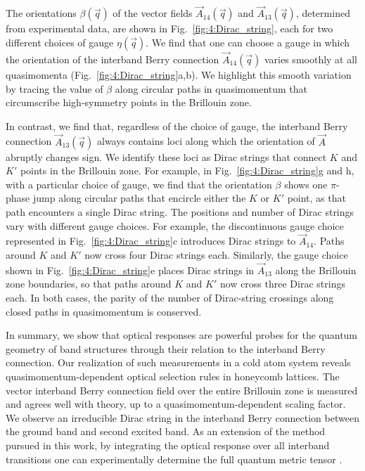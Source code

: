 \documentclass[superscriptaddress, reprint, amsmath, amssymb, aps, prl]{revtex4-2}
\begin{document}
The orientations $\beta(\vec{q})$ of the vector fields $\vec{A}_{14}(\vec{q})$ and $\vec{A}_{13}(\vec{q})$, determined from experimental data, are shown in Fig.\ \ref{fig:4:Dirac_string}, each for two different choices of gauge $\eta(\vec{q})$.  We find that one can choose a gauge in which the orientation of the interband Berry connection $\vec{A}_{14}(\vec{q})$ varies smoothly at all quasimomenta (Fig.~\ref{fig:4:Dirac_string}a,b).  We highlight this smooth variation by tracing the value of $\beta$ along circular paths in quasimomentum that circumscribe high-symmetry points in the Brillouin zone.

In contrast, we find that, regardless of the choice of gauge, the interband Berry connection $\vec{A}_{13}(\vec{q})$ always contains loci along which the orientation of $\vec{A}$ abruptly changes sign.  We identify these loci as Dirac strings that connect $K$ and $K'$ points in the Brillouin zone. For example, in Fig.\ \ref{fig:4:Dirac_string}g and h, with a particular choice of gauge, we find that the orientation $\beta$ shows one $\pi$-phase jump along circular paths that encircle either the $K$ or $K'$ point, as that path encounters a single Dirac string.
The positions and number of Dirac strings vary with different gauge choices. For example, the discontinuous gauge choice represented in Fig.~\ref{fig:4:Dirac_string}c introduces Dirac strings to $\vec{A}_{14}$. Paths around $K$ and $K'$ now cross four Dirac strings each. Similarly, the gauge choice shown in Fig.~\ref{fig:4:Dirac_string}e places Dirac strings in $\vec{A}_{13}$ along the Brillouin zone boundaries, so that paths around $K$ and $K'$ now cross three Dirac strings each. In both cases, the parity of the number of Dirac-string crossings along closed paths in quasimomentum is conserved.

In summary, we show that optical responses are powerful probes for the quantum geometry of band structures through their relation to the interband Berry connection. Our realization of such measurements in a cold atom system reveals quasimomentum-dependent optical selection rules in honeycomb lattices. The vector interband Berry connection field over the entire Brillouin zone is measured and agrees well with theory, up to a quasimomentum-dependent scaling factor. We observe an irreducible Dirac string in the interband Berry connection between the ground band and second excited band. As an extension of the method pursued in this work, by integrating the optical response over all interband transitions one can experimentally determine the full quantum metric tensor \cite{ozawa_extracting_2018}.
\end{document}
